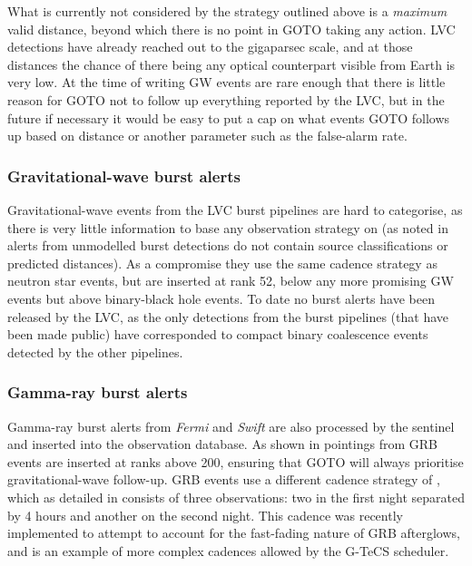 \begin{colsection}
What is currently not considered by the strategy outlined above is a \textit{maximum} valid distance, beyond which there is no point in GOTO taking any action. LVC detections have already reached out to the gigaparsec scale, and at those distances the chance of there being any optical counterpart visible from Earth is very low. At the time of writing GW events are rare enough that there is little reason for GOTO not to follow up everything reported by the LVC, but in the future if necessary it would be easy to put a cap on what events GOTO follows up based on distance or another parameter such as the false-alarm rate.

\newpage

\subsubsection{Gravitational-wave burst alerts}

Gravitational-wave events from the LVC burst pipelines \citep{GW_burst} are hard to categorise, as there is very little information to base any observation strategy on (as noted in  alerts from unmodelled burst detections do not contain source classifications or predicted distances). As a compromise they use the same cadence strategy as neutron star events, but are inserted at rank 52, below any more promising GW events but above binary-black hole events. To date no burst alerts have been released by the LVC, as the only detections from the burst pipelines (that have been made public) have corresponded to compact binary coalescence events detected by the other pipelines.

\subsubsection{Gamma-ray burst alerts}

Gamma-ray burst alerts from \textit{Fermi} and \textit{Swift} are also processed by the sentinel and inserted into the observation database. As shown in  pointings from GRB events are inserted at ranks above 200, ensuring that GOTO will always prioritise gravitational-wave follow-up. GRB events use a different cadence strategy of , which as detailed in  consists of three observations: two in the first night separated by 4 hours and another on the second night. This cadence was recently implemented to attempt to account for the fast-fading nature of GRB afterglows, and is an example of more complex cadences allowed by the G-TeCS scheduler.


\end{colsection}

